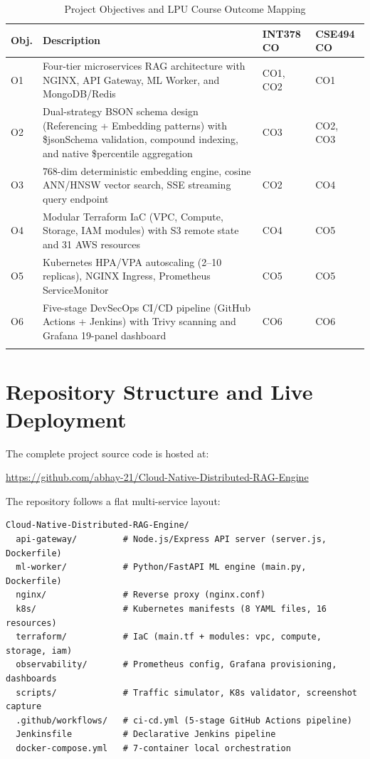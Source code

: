 \documentclass[12pt,a4paper]{report}
\begin{document}
\begin{longtable}{@{}p{0.6cm}p{5.5cm}p{3.8cm}p{3.5cm}@{}}
  \toprule
  \textbf{Obj.} & \textbf{Description} & \textbf{INT378 CO} & \textbf{CSE494 CO} \\
  \midrule
  O1 & Four-tier microservices RAG architecture with NGINX, API Gateway,
       ML Worker, and MongoDB/Redis & CO1, CO2 & CO1 \\[0.3cm]
  O2 & Dual-strategy BSON schema design (Referencing + Embedding patterns)
       with \$jsonSchema validation, compound indexing, and native
       \$percentile aggregation & CO3 & CO2, CO3 \\[0.3cm]
  O3 & 768-dim deterministic embedding engine, cosine ANN/HNSW vector search,
       SSE streaming query endpoint & CO2 & CO4 \\[0.3cm]
  O4 & Modular Terraform IaC (VPC, Compute, Storage, IAM modules) with S3
       remote state and 31 AWS resources & CO4 & CO5 \\[0.3cm]
  O5 & Kubernetes HPA/VPA autoscaling (2--10 replicas), NGINX Ingress,
       Prometheus ServiceMonitor & CO5 & CO5 \\[0.3cm]
  O6 & Five-stage DevSecOps CI/CD pipeline (GitHub Actions + Jenkins) with
       Trivy scanning and Grafana 19-panel dashboard & CO6 & CO6 \\
  \bottomrule
  \caption{Project Objectives and LPU Course Outcome Mapping}
  \label{tab:objectives}
\end{longtable}

\section{Repository Structure and Live Deployment}

The complete project source code is hosted at:
\begin{center}
  \href{https://github.com/abhay-21/Cloud-Native-Distributed-RAG-Engine}{https://github.com/abhay-21/Cloud-Native-Distributed-RAG-Engine}
\end{center}

The repository follows a flat multi-service layout:

\begin{verbatim}
Cloud-Native-Distributed-RAG-Engine/
  api-gateway/         # Node.js/Express API server (server.js, Dockerfile)
  ml-worker/           # Python/FastAPI ML engine (main.py, Dockerfile)
  nginx/               # Reverse proxy (nginx.conf)
  k8s/                 # Kubernetes manifests (8 YAML files, 16 resources)
  terraform/           # IaC (main.tf + modules: vpc, compute, storage, iam)
  observability/       # Prometheus config, Grafana provisioning, dashboards
  scripts/             # Traffic simulator, K8s validator, screenshot capture
  .github/workflows/   # ci-cd.yml (5-stage GitHub Actions pipeline)
  Jenkinsfile          # Declarative Jenkins pipeline
  docker-compose.yml   # 7-container local orchestration
\end{verbatim}
\end{document}
